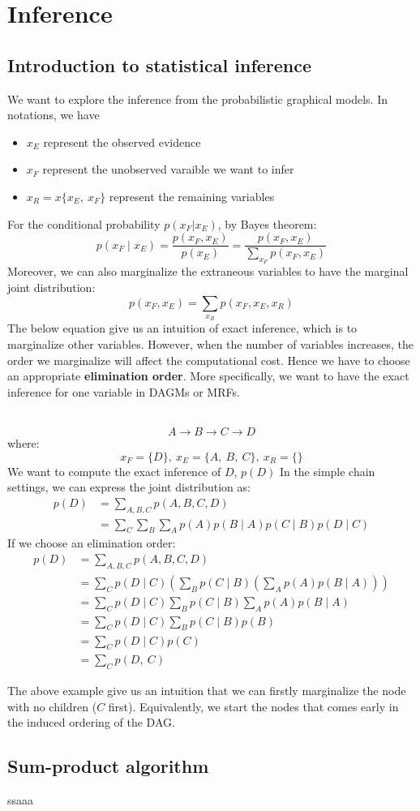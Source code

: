\section{Inference}
\subsection{Introduction to statistical inference}
We want to explore the inference from the probabilistic graphical models. In notations, we have
\begin{itemize}
    \item $x_E$ represent the observed evidence
    \item $x_F$ represent the unobserved varaible we want to infer
    \item $x_R=x\{x_E,\:x_F\}$ represent the remaining variables
\end{itemize} 
For the conditional probability $p(x_F|x_E)$, by Bayes theorem:
$$p\left(x_F \mid x_E\right)=\frac{p\left(x_F, x_E\right)}{p\left(x_E\right)}=\frac{p\left(x_F, x_E\right)}{\sum_{x_F} p\left(x_F, x_E\right)}$$
Moreover, we can also marginalize the extraneous variables to have the marginal joint distribution:
$$p\left(x_F, x_E\right)=\sum_{x_R} p\left(x_F, x_E, x_R\right)$$
The below equation give us an intuition of exact inference, which is to marginalize other variables. However, when the number of variables increases, the order we marginalize will affect the computational cost. Hence we have to choose an appropriate \textbf{elimination order}. More specifically, we want to have the exact inference for one variable in DAGMs or MRFs.
\begin{example}
    \\
    $$A \rightarrow B \rightarrow C \rightarrow D$$
    where:
    $$x_F=\{D\},\:x_E=\{A,\:B,\:C\},\:x_R=\{\}$$
    We want to compute the exact inference of $D$, $p(D)$
    In the simple chain settings, we can express the joint distribution as:
    \begin{align*}
        p(D)&=\sum_{A,B,C}p(A,B,C,D)\\
        &=\sum_C \sum_B \sum_A p(A) p(B \mid A) p(C \mid B) p(D \mid C)
    \end{align*}
    If we choose an elimination order:
    \begin{align*}
        p(D)&=\sum_{A,B,C}p(A,B,C,D)\\
        &=\sum_C p(D \mid C)\left(\sum_B p(C \mid B)\left(\sum_A p(A) p(B \mid A)\right)\right)\\
        &=\sum_C p(D \mid C) \sum_B p(C \mid B) \sum_A p(A) p(B \mid A) \\
        & =\sum_C p(D \mid C) \sum_B p(C \mid B) p(B) \\
        & =\sum_C p(D \mid C) p(C)\\
        & =\sum_C p(D,\:C)
    \end{align*}
\end{example}
The above example give us an intuition that we can firstly marginalize the node with no children ($C$ first). Equivalently, we start the nodes that comes early in the induced ordering of the DAG.
\subsection{Sum-product algorithm}
\begin{example}
    ssaaa
\end{example}